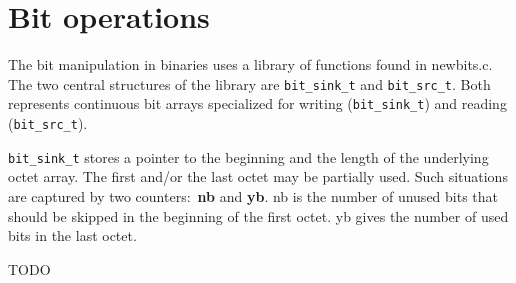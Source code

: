 \documentclass{article}
\begin{document}
\section{Bit operations}

The bit manipulation in binaries uses a library of functions found in newbits.c.
The two central structures of the library are \verb$bit_sink_t$ and
\verb$bit_src_t$. Both represents continuous bit arrays specialized for writing
(\verb$bit_sink_t$) and reading (\verb$bit_src_t$).

\verb$bit_sink_t$ stores a pointer to the beginning and the length of the
underlying octet array. The first and/or the last octet may be partially used.
Such situations are captured by two counters$:$ \textbf{nb} and \textbf{yb}. nb
is the number of unused bits that should be skipped in the beginning of the
first octet.  yb gives the number of used bits in the last octet.

TODO
\end{document}
